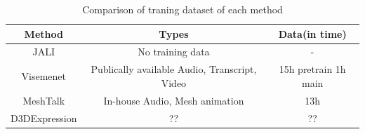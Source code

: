 \documentclass[10pt,twocolumn,letterpaper]{article}
\begin{document}
\begin{table}
   \centering
   \begin{tabular}{c|cc}
      \toprule
      Method & Types & Data(in time) \\
      \midrule
      JALI & No training data & - \\
      Visemenet & Publically available Audio, Transcript, Video & 15h pretrain 1h main \\
      MeshTalk & In-house Audio, Mesh animation & 13h \\
      D3DExpression & ?? & ??\\
      \bottomrule
   \end{tabular}
   \caption{Comparison of traning dataset of each method}
   \label{table:data_cmp}
\end{table}


{\small



}
\end{document}
